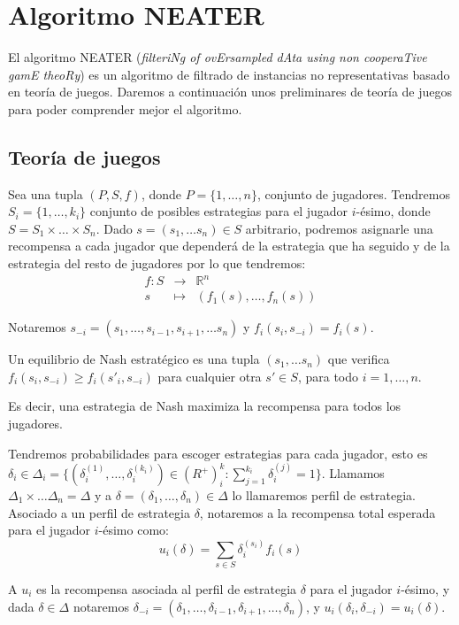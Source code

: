 \section{Algoritmo NEATER}
El algoritmo NEATER (\textit{filteriNg of ovErsampled dAta using non cooperaTive gamE theoRy}) es un algoritmo de filtrado 
de instancias no representativas basado en teoría de juegos. Daremos a continuación unos preliminares de teoría de juegos
para poder comprender mejor el algoritmo.

\subsection{Teoría de juegos}
Sea una tupla $(P, S, f)$, donde $P=\{1, \ldots, n\}$, conjunto de jugadores. Tendremos $S_i=\{1, \ldots, k_i\}$ conjunto
de posibles estrategias para el jugador $i$-ésimo, donde $S = S_1 \times \ldots \times S_n$. Dado $s = (s_1, \ldots s_n) \in S$
arbitrario, podremos asignarle una recompensa a cada jugador que dependerá de la estrategia que ha seguido y de la estrategia del
resto de jugadores por lo que tendremos:
\[
  \begin{array}{rll}
  f: S &\longrightarrow& \mathbb{R}^n\\
  s &\longmapsto& (f_1(s), \ldots, f_n(s))
 \end{array}
\]
  
Notaremos $s_{-i} = (s_1, \ldots, s_{i-1}, s_{i+1}, \ldots s_n)$ y $f_i(s_i, s_{-i})= f_i(s)$.

\begin{definition}
Un equilibrio de Nash estratégico es una tupla $(s_1, \ldots s_n)$ que verifica $f_i(s_i, s_{-i}) \ge f_i(s'_{i}, s_{-i})$ 
para cualquier otra $s'\in S$, para todo $i=1, \ldots, n$.
\end{definition}

Es decir, una estrategia de Nash maximiza la recompensa para todos los jugadores.

Tendremos probabilidades para escoger estrategias para cada jugador, esto es 
$\delta_i \in \Delta_i = \{(\delta_i^{(1)}, \ldots, \delta_i^{(k_i)}) \in (R^{+})^k_i : \sum_{j=1}^{k_i} \delta_i^{(j)} = 1\}$. 
Llamamos $\Delta_1 \times \ldots \Delta_n = \Delta$ y a $\delta = (\delta_1, \ldots, \delta_n) \in \Delta$ lo llamaremos perfil de estrategia. 
Asociado a un perfil de estrategia $\delta$, notaremos a la recompensa total esperada para el jugador $i$-ésimo como:
\[
  u_i(\delta) = \sum_{s\in S} \delta_i^{(s_i)} f_i(s)
\]

A $u_i$ es la recompensa asociada al perfil de estrategia $\delta$ para el jugador $i$-ésimo, y dada $\delta\in \Delta$ notaremos
$\delta_{-i} = (\delta_1, \ldots, \delta_{i-1}, \delta_{i+1}, \ldots, \delta_n)$, y $u_i(\delta_i, \delta_{-i})= u_i(\delta)$.

